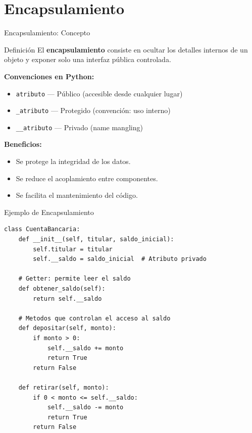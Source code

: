 \documentclass[aspectratio=169]{beamer}
\begin{document}
\section{Encapsulamiento}

\begin{frame}{Encapsulamiento: Concepto}
    \begin{block}{Definición}
        El \textbf{encapsulamiento} consiste en ocultar los detalles internos de un objeto y exponer solo una interfaz pública controlada.
    \end{block}
    \vspace{0.5cm}
    
    \textbf{Convenciones en Python:}
    \begin{itemize}
        \item \texttt{atributo} — Público (accesible desde cualquier lugar)
        \item \texttt{\_atributo} — Protegido (convención: uso interno)
        \item \texttt{\_\_atributo} — Privado (name mangling)
    \end{itemize}
    \vspace{0.3cm}
    
    \textbf{Beneficios:}
    \begin{itemize}
        \item Se protege la integridad de los datos.
        \item Se reduce el acoplamiento entre componentes.
        \item Se facilita el mantenimiento del código.
    \end{itemize}
\end{frame}

\begin{frame}[fragile]{Ejemplo de Encapsulamiento}
    \begin{lstlisting}[title=Atributos Privados y Métodos de Acceso]
class CuentaBancaria:
    def __init__(self, titular, saldo_inicial):
        self.titular = titular
        self.__saldo = saldo_inicial  # Atributo privado
    
    # Getter: permite leer el saldo
    def obtener_saldo(self):
        return self.__saldo
    
    # Metodos que controlan el acceso al saldo
    def depositar(self, monto):
        if monto > 0:
            self.__saldo += monto
            return True
        return False
    
    def retirar(self, monto):
        if 0 < monto <= self.__saldo:
            self.__saldo -= monto
            return True
        return False
    \end{lstlisting}
\end{frame}
\end{document}
